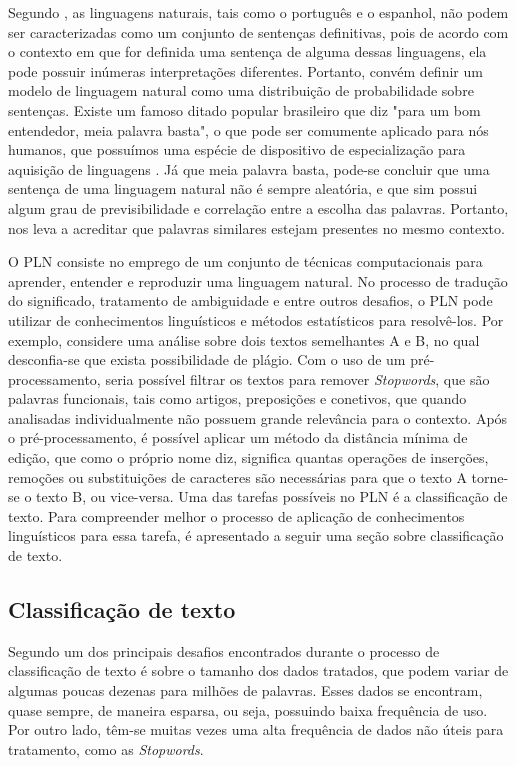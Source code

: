 Segundo \cite{russell1994inteligencia}, as linguagens naturais, tais como o português e o espanhol, não podem ser caracterizadas como um conjunto de sentenças definitivas, pois de acordo com o contexto em que for definida uma sentença de alguma dessas linguagens, ela pode possuir inúmeras interpretações diferentes. Portanto, convém definir um modelo de linguagem natural como uma distribuição de probabilidade sobre sentenças. Existe um famoso ditado popular brasileiro que diz "para um bom entendedor, meia palavra basta", o que pode ser comumente aplicado para nós humanos, que possuímos uma espécie de dispositivo de especialização para aquisição de linguagens \citep{chomsky2014aspects}. Já que meia palavra basta, pode-se concluir que uma sentença de uma linguagem natural não é sempre aleatória, e que sim possui algum grau de previsibilidade e correlação entre a escolha das palavras. Portanto, nos leva a acreditar que palavras similares estejam presentes no mesmo contexto.

O PLN consiste no emprego de um conjunto de técnicas computacionais para aprender, entender e reproduzir uma linguagem natural. No processo de tradução do significado, tratamento de ambiguidade e entre outros desafios, o PLN pode utilizar de conhecimentos linguísticos e métodos estatísticos para resolvê-los. Por exemplo, considere uma análise sobre dois textos semelhantes A e B, no qual desconfia-se que exista possibilidade de plágio. Com o uso de um pré-processamento, seria possível filtrar os textos para remover \textit{Stopwords}, que são palavras funcionais, tais como artigos, preposições e conetivos, que quando analisadas individualmente não possuem grande relevância para o contexto. Após o pré-processamento, é possível aplicar um método da distância mínima de edição, que como o próprio nome diz, significa quantas operações de inserções, remoções ou substituições de caracteres são necessárias para que o texto A torne-se o texto B, ou vice-versa. Uma das tarefas possíveis no PLN é a classificação de texto. Para compreender melhor o processo de aplicação de conhecimentos linguísticos para essa tarefa, é apresentado a seguir uma seção sobre classificação de texto.

\subsection{Classificação de texto}
Segundo \cite{aggarwal2014data} um dos principais desafios encontrados durante o processo de classificação de texto é sobre o tamanho dos dados tratados, que podem variar de algumas poucas dezenas para milhões de palavras. Esses dados se encontram, quase sempre, de maneira esparsa, ou seja, possuindo baixa frequência de uso. Por outro lado, têm-se muitas vezes uma alta frequência de dados não úteis para tratamento, como as \textit{Stopwords}.

